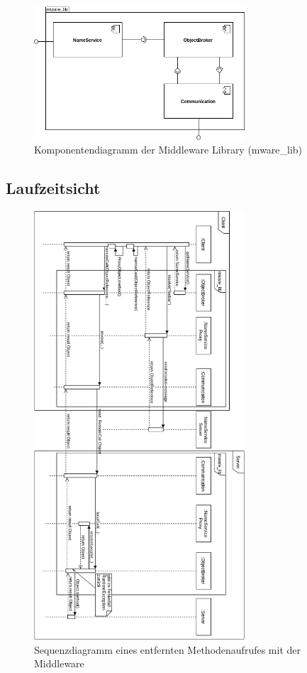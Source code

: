 \documentclass{article}
\begin{document}
\begin{figure}[H]
    \centering
    \includegraphics[width=0.7\textwidth]{Middleware_Components.png}
    \caption[middleware-components]{Komponentendiagramm der Middleware Library (mware\_lib)}
    \label{fig:middleware-components-diagram}
\end{figure}

\subsection{Laufzeitsicht}
\begin{figure}[H]
    \centering
    \includegraphics[width=0.7\textwidth]{full-sequence.png}
    \caption[full-seq-diagram]{Sequenzdiagramm eines entfernten Methodenaufrufes mit der Middleware}
    \label{fig:full-seq-diagram}
\end{figure}
\end{document}

